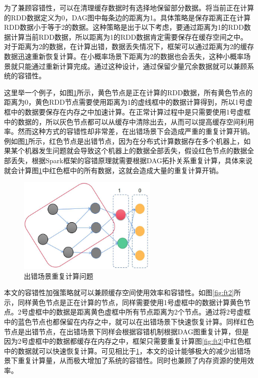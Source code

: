为了兼顾容错性，可以在清理缓存数据时有选择地保留部分数据。将当前正在计算的RDD数据定义为0，DAG图中每条边的距离为1。具体策略是保存距离正在计算RDD数据小于等于2的数据。这种策略是出于以下考虑，要通过距离为1的RDD数据计算当前RDD数据，所以距离为1的RDD数据肯定需要保存在缓存空间之中。对于距离为2的数据，在计算出错，数据丢失情况下，框架可以通过距离为2的缓存数据迅速重新恢复计算。在小概率场景下距离为2的数据也会丢失，这种小概率场景就只能通过重新计算完成。通过这种设计，通过保留少量冗余数据就可以兼顾系统的容错性。

这里举一个例子，如图\ref{fig:ft1}所示，黄色节点是正在计算的RDD数据，所有黄色节点的距离为0，黄色RDD节点需要使用距离为1的虚线框中的数据计算得到，所以1号虚框中的数据要保存在内存之中加速计算。在正常计算过程中是只需要使用1号虚框中的数据的，所以灰色节点都可以从缓存中清除出去，从而可以提高缓存空间利用率。然而这种方式的容错性却非常差，在出错场景下会造成严重的重复计算开销。例如图\ref{fig:ft1}所示，红色节点是出错节点，因为在分布式计算数据存在多个机器上，如果某个机器发生问题就会导致这个机器上的数据全部丢失，假设红色节点的数据全部丢失，根据Spark框架的容错原理就需要根据DAG拓扑关系重复计算，具体来说就会计算图\ref{fig:ft1}中红色框中的所有数据，这就会造成大量的重复计算开销。

\begin{figure}[htbp]
    \centering
    \includegraphics[width=0.6\textwidth]{Img/ft1.png}
    \caption{出错场景重复计算问题}
    \label{fig:ft1}
\end{figure}

本文的容错性加强策略就可以兼顾缓存空间使用效率和容错性。如图\ref{fig:ft2}所示，同样黄色节点是正在计算的节点，同样需要使用1号虚框中的数据计算黄色节点。2号虚框中的数据是距离黄色虚框中所有节点距离为2个节点。通过将2号虚框中的蓝色节点也都保留在内存之中，就可以在出错场景下快速恢复计算。同样红色节点是出错节点，在出错场景下同样会根据容错机制根据DAG图重复计算，但是因为2号虚框中的数据都缓存在内存之中，框架只需要重复计算图\ref{fig:ft2}中红色框中的数据就可以快速恢复计算。可见相比于\ref{fig:ft1}，本文的设计能够极大的减少出错场景下重复计算量，从而极大增加了系统的容错性。同时也兼顾了内存资源的使用效率。

